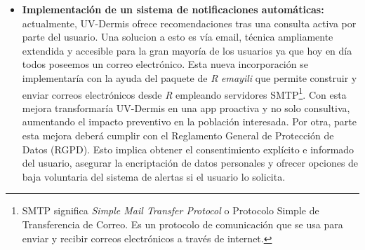\begin{itemize}
     \item \textbf{Implementación de un sistema de notificaciones automáticas:} actualmente, UV-Dermis ofrece recomendaciones tras una consulta activa por parte del usuario. Una solucion a esto es vía email, técnica ampliamente extendida y accesible para la gran mayoría de los usuarios ya que hoy en día todos poseemos un correo electrónico. Esta nueva incorporación se implementaría con la ayuda del paquete de \textit{R} \textit{emayili} que permite construir y enviar correos electrónicos desde \textit{R} empleando servidores SMTP\footnote{SMTP significa \textit{Simple Mail Transfer Protocol} o Protocolo Simple de Transferencia de Correo. Es un protocolo de comunicación que se usa para enviar y recibir correos electrónicos a través de internet.}\cite{collierDatawookieEmayili2025}. Con esta mejora transformaría UV-Dermis en una app proactiva y no solo consultiva, aumentando el impacto preventivo en la población interesada.
     Por otra, parte esta mejora deberá cumplir con el Reglamento General de Protección de Datos (RGPD). Esto implica obtener el consentimiento explícito e informado del usuario, asegurar la encriptación de datos personales y ofrecer opciones de baja voluntaria del sistema de alertas si el usuario lo solicita.
 \end{itemize}

